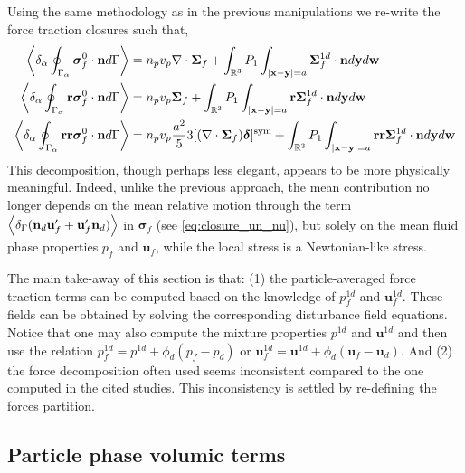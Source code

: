 Using the same methodology as in the previous manipulations we re-write the force traction closures such that, 
\begin{align}
    \pSavg{\bm\sigma_f^0\cdot\textbf{n}}
    &=
    n_p v_p 
    \div\bm\Sigma_f
    +
    \int_{\mathbb{R}^3}
    P_1
    \int_{|\textbf{x}-\textbf{y}|=a}
    \bm\Sigma_f^{1d} \cdot \textbf{n}
    d\textbf{y}d\textbf{w}
    \label{eq:drag_final2}\\
    \pSavg{\textbf{r}\bm\sigma_f^0\cdot\textbf{n}}
    &=
    n_p v_p \bm\Sigma_f
    +
    \int_{\mathbb{R}^3}
    P_1
    \int_{|\textbf{x}-\textbf{y}|=a}
    \textbf{r}\bm\Sigma_f^{1d} \cdot \textbf{n}
    d\textbf{y}
    d\textbf{w}
    \\
    \pSavg{\textbf{rr}\bm\sigma_f^0\cdot\textbf{n}}
    &=
    n_pv_p  \frac{a^2}{5} 3 [(\div \bm\Sigma_f)\bm\delta]^\text{sym}
    +
    \int_{\mathbb{R}^3}
    P_1
    \int_{|\textbf{x}-\textbf{y}|=a}
    \textbf{rr}\bm\Sigma_f^{1d} \cdot \textbf{n}
    d\textbf{y}
    d\textbf{w}
    \label{eq:second_mom_general2}
\end{align}
This decomposition, though perhaps less elegant, appears to be more physically meaningful. 
Indeed, unlike the previous approach, the mean contribution no longer depends on the mean relative motion through the term $\left<\delta_\Gamma (\textbf{n}_d \textbf{u}_f'+  \textbf{u}_f' \textbf{n}_d)\right>$ in $\bm\sigma_f$ (see \ref{eq:closure_un_nu}), but solely on the mean fluid phase properties $p_f$ and $\textbf{u}_f$, while the local stress is a Newtonian-like stress.  

The main take-away of this section is that: (1)  the particle-averaged force traction terms can be computed based on the knowledge of $p_f^{1d}$ and $\textbf{u}_f^{1d}$. 
These fields can be obtained by solving the corresponding disturbance field equations. 
Notice that one may also compute the mixture properties $p^{1d}$ and $\textbf{u}^{1d}$ and then use the relation $p_f^{1d} = p^{1d} + \phi_d (p_f - p_d)$ or $\textbf{u}_f^{1d} = \textbf{u}^{1d} + \phi_d (\textbf{u}_f - \textbf{u}_d)$. 
And (2) the force decomposition often used \citep{jackson2000,zhang1997momentum,wang2021numerical,wang2024effect} seems inconsistent compared to the one computed in the cited studies.
This inconsistency is settled by re-defining the forces partition.  

\subsection{Particle phase volumic terms}

